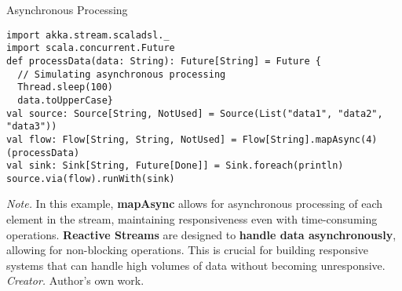 \begin{table}[H]
\caption{Asynchronous Processing}
\begin{lstlisting}
import akka.stream.scaladsl._
import scala.concurrent.Future
def processData(data: String): Future[String] = Future {
  // Simulating asynchronous processing
  Thread.sleep(100)
  data.toUpperCase}
val source: Source[String, NotUsed] = Source(List("data1", "data2", "data3"))
val flow: Flow[String, String, NotUsed] = Flow[String].mapAsync(4)(processData)
val sink: Sink[String, Future[Done]] = Sink.foreach(println)
source.via(flow).runWith(sink)
\end{lstlisting}
\small
\textit{Note.} In this example, \textbf{mapAsync} allows for asynchronous processing of each element in the stream, maintaining responsiveness even with time-consuming operations. \textbf{Reactive Streams} are designed to \textbf{handle data asynchronously}, allowing for non-blocking operations. This is crucial for building responsive systems that can handle high volumes of data without becoming unresponsive.
\textit{Creator.} Author's own work.
\end{table}